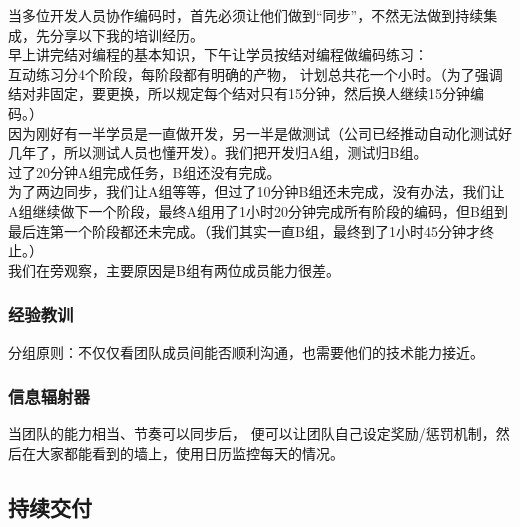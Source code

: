 当多位开发人员协作编码时，首先必须让他们做到``同步''，不然无法做到持续集成，先分享以下我的培训经历。\\
早上讲完结对编程的基本知识，下午让学员按结对编程做编码练习：\\
互动练习分4个阶段，每阶段都有明确的产物，
计划总共花一个小时。（为了强调结对非固定，要更换，所以规定每个结对只有15分钟，然后换人继续15分钟编码。）\\
因为刚好有一半学员是一直做开发，另一半是做测试（公司已经推动自动化测试好几年了，所以测试人员也懂开发）。我们把开发归A组，测试归B组。\\
过了20分钟A组完成任务，B组还没有完成。\\
为了两边同步，我们让A组等等，但过了10分钟B组还未完成，没有办法，我们让A组继续做下一个阶段，最终A组用了1小时20分钟完成所有阶段的编码，但B组到最后连第一个阶段都还未完成。（我们其实一直B组，最终到了1小时45分钟才终止。）\\
我们在旁观察，主要原因是B组有两位成员能力很差。

\hypertarget{ux7ecfux9a8cux6559ux8bad}{%
\subsubsection{经验教训}\label{ux7ecfux9a8cux6559ux8bad}}

分组原则：不仅仅看团队成员间能否顺利沟通，也需要他们的技术能力接近。

\hypertarget{ux4fe1ux606fux8f90ux5c04ux5668}{%
\subsubsection{信息辐射器}\label{ux4fe1ux606fux8f90ux5c04ux5668}}

当团队的能力相当、节奏可以同步后，
便可以让团队自己设定奖励/惩罚机制，然后在大家都能看到的墙上，使用日历监控每天的情况。


\hypertarget{ux6301ux7eedux4ea4ux4ed8}{%
\subsection{持续交付}\label{ux6301ux7eedux4ea4ux4ed8}}

